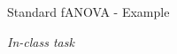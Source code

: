 \documentclass[10pt,compress,t,notes=noshow, xcolor=table]{beamer}
\begin{document}
\begin{frame}{Standard fANOVA - Example}

\textit{In-class task}



    


    
\end{frame}
\end{document}
